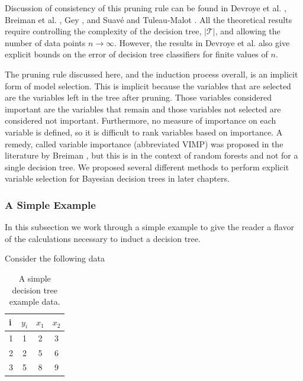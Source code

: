 Discussion of consistency of this pruning rule can be found in Devroye et al. \cite{devroye1996probabilistic}, Breiman et al. \cite{breiman1984classification}, Gey \cite{gey2005model}, and Suav\'{e} and Tuleau-Malot \cite{sauve2011variable}. All the theoretical results require controlling the complexity of the decision tree, $\vert\mathcal{T}\vert$, and allowing the number of data points $n\to\infty$. However, the results in Devroye et al. \cite{devroye1996probabilistic} also give explicit bounds on the error of decision tree classifiers for finite values of $n$. 

The pruning rule discussed here, and the induction process overall, is an implicit form of model selection. This is implicit because the variables that are selected are the variables left in the tree after pruning. Those variables considered important are the variables that remain and those variables not selected are considered not important. Furthermore, no measure of importance on each variable is defined, so it is difficult to rank variables based on importance. A remedy, called variable importance (abbreviated VIMP) was proposed in the literature by Breiman \cite{breiman2001random}, but this is in the context of random forests and not for a single decision tree. We proposed several different methods to perform explicit variable selection for Bayesian decision trees in later chapters.   

\subsubsection{A Simple Example}

In this subsection we work through a simple example to give the reader a flavor of the calculations necessary to induct a decision tree. 

Consider the following data 

\begin{table}[H]
\begin{center}
\begin{tabular}{ l | c | c | c }
  i& $y_i$ & $x_1$ & $x_2$\\
  \hline
  1&1 & 2 & 3 \\
  2&2 & 5 & 6 \\
  3&5 & 8 & 9 \\
\end{tabular}
\caption[A simple decision tree example data]{A simple decision tree example data.}
\label{fig:dtree_firststep}
\end{center}
\end{table}


